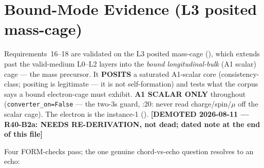 \section{Bound-Mode Evidence (L3 posited mass-cage)}
\label{sec:vol9_engine_rung1_existence}

Requirements~16--18 are validated on the L3 posited mass-cage
(), which extends past the valid-medium L0--L2 layers into the \emph{bound longitudinal-bulk} (A1 scalar) cage --- the mass precursor. It \textbf{POSITS} a saturated A1-scalar core (consistency-class; positing is legitimate --- it is not self-formation) and tests what the corpus says a bound electron-cage must exhibit. \textbf{A1 SCALAR ONLY} throughout (\texttt{converter\_on=False} --- the two-3s guard, :20: never read charge/spin/$\mu$ off the scalar cage). The electron is the  instance-1 (). \textbf{[DEMOTED 2026-08-11 --- R40-B2a: NEEDS RE-DERIVATION, not dead; dated note at the end of this file]}

Four FORM-checks pass; the one genuine chord-vs-echo question resolves to an echo:

